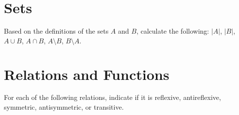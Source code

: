 \documentclass[solutionorbox,answers]{exam}
\begin{document}
\begin{questions}

\newpage
\section*{Sets}


  \question
  Based on the definitions of the sets $A$ and $B$, calculate the following: $|A|$, $|B|$, $A \cup B$, $A \cap B$, $A \setminus B$, $B \setminus A$.


\section*{Relations and Functions}

\question
For each of the following relations, indicate if it is reflexive, antireflexive, symmetric, antisymmetric, or transitive.

\end{questions}
\end{document}
